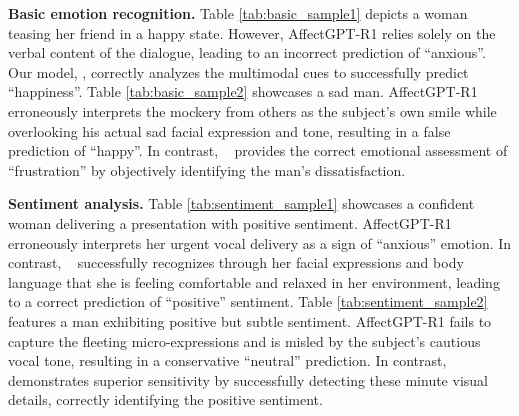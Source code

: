 \documentclass{article}
\theoremstyle{plain}
\theoremstyle{definition}
\theoremstyle{remark}
\begin{document}
\noindent\textbf{Basic emotion recognition.} 
Table \ref{tab:basic_sample1} depicts a woman teasing her friend in a happy state. However, AffectGPT-R1 relies solely on the verbal content of the dialogue, leading to an incorrect prediction of ``anxious''. Our model, \ourmethod, correctly analyzes the multimodal cues to successfully predict ``happiness''.
Table \ref{tab:basic_sample2} showcases a sad man. AffectGPT-R1 erroneously interprets the mockery from others as the subject's own smile while overlooking his actual sad facial expression and tone, resulting in a false prediction of ``happy''. In contrast, \ourmethod~ provides the correct emotional assessment of ``frustration'' by objectively identifying the man's dissatisfaction.

\noindent\textbf{Sentiment analysis.} 
Table \ref{tab:sentiment_sample1} showcases a confident woman delivering a presentation with positive sentiment. AffectGPT-R1 erroneously interprets her urgent vocal delivery as a sign of ``anxious'' emotion. In contrast, \ourmethod~ successfully recognizes through her facial expressions and body language that she is feeling comfortable and relaxed in her environment, leading to a correct prediction of ``positive'' sentiment. 
Table \ref{tab:sentiment_sample2} features a man exhibiting positive but subtle sentiment. AffectGPT-R1 fails to capture the fleeting micro-expressions and is misled by the subject's cautious vocal tone, resulting in a conservative ``neutral'' prediction. In contrast, \ourmethod~ demonstrates superior sensitivity by successfully detecting these minute visual details, correctly identifying the positive sentiment.
\end{document}
